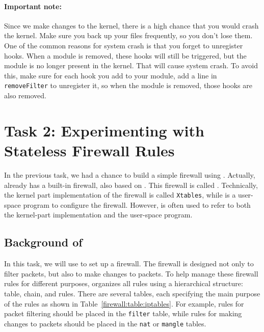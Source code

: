 \paragraph{Important note:} Since we make changes to the kernel, there is a high chance that you would 
crash the kernel. Make sure you back up your files frequently, so you don't 
lose them. One of the common reasons for system crash is that 
you forget to unregister hooks. When a module is removed,
these hooks will still be triggered, but the module is no longer present 
in the kernel. That will cause system crash.
To avoid this, make sure for each hook you
add to your module, add a line in \texttt{removeFilter} to unregister it, 
so when the module is removed, those hooks are also removed. 


\section{Task 2: Experimenting with Stateless Firewall Rules}

In the previous task, we had a chance to build a simple firewall using \netfilter. Actually,
\linux already has a built-in firewall, also based on \netfilter. This firewall is called
\iptables. Technically, the kernel part implementation of the firewall
is called \texttt{Xtables}, while \iptables is a user-space program to
configure the firewall. However, \iptables is often used to refer to both the kernel-part
implementation and the user-space program. 



\subsection{Background of \iptables}

In this task, we will use \iptables to set up a firewall. 
The \iptables firewall is designed not only to filter packets, but also to make changes to
packets. To help manage these firewall rules for different purposes, \iptables organizes all
rules using a hierarchical structure: table, chain, and rules.
There are several tables, each specifying the main purpose of the rules as shown
in Table~\ref{firewall:table:iptables}.
For example, rules for packet filtering should be
placed in the \texttt{filter} table, while rules for making changes to packets should be placed
in the \texttt{nat} or \texttt{mangle} tables.

